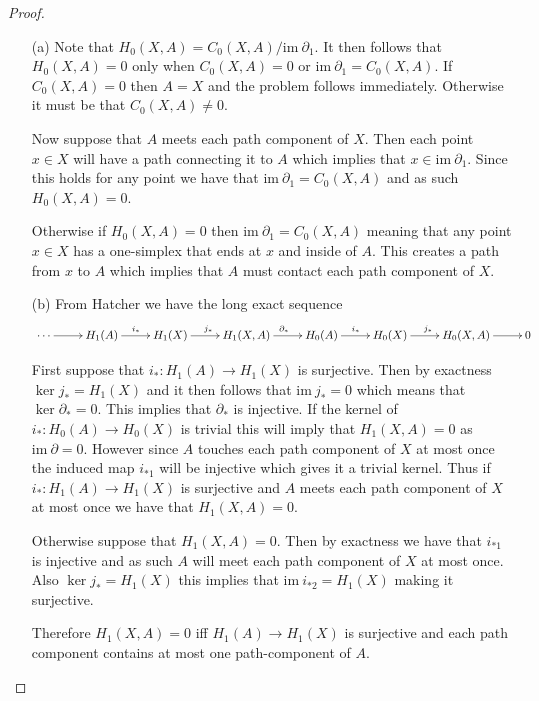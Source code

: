 \documentclass[10pt]{article}
\newcommand{\ima}{\mathrm{im}\ }
\theoremstyle{plain}
\theoremstyle{remark}
\begin{document}
\begin{proof}\ \\
  \begin{enumerate}
  \item[(a)] Note that $H_0(X,A)=C_0(X,A)/\ima\partial_1$. It then follows that
    $H_0(X,A)=0$ only when $C_0(X,A)=0$ or $\ima\partial_1=C_0(X,A)$. If $C_0(X,A)=0$
    then $A=X$ and the problem follows immediately. Otherwise it must
    be that $C_0(X,A)\neq 0$.

    Now suppose that $A$ meets each path component of $X$. Then each
    point $x\in X$ will have a path connecting it to $A$ which implies that
    $x\in\ima \partial_1$. Since this holds for any point we have that $\ima\partial_1=C_0(X,A)$
    and as such $H_0(X,A)=0$.

    Otherwise if $H_0(X,A)=0$ then $\ima\partial_1=C_0(X,A)$ meaning that any
    point $x\in X$ has a one-simplex that ends at $x$ and inside of $A$.
    This creates a path from $x$ to $A$ which implies that $A$ must
    contact each path component of $X$.
  \item[(b)] From Hatcher we have the long exact sequence
    \[
      \xymatrix{\cdots\ar[r]&H_1(A)\ar[r]^{i_*} & H_1(X) \ar[r]^{j_*} & H_1(X,A) \ar[r]^{\partial_*} &
        H_0(A) \ar[r]^{i_*} & H_0(X) \ar[r]^{j_*} & H_0(X,A) \ar[r] & 0}
    \]

    First suppose that $i_*:H_1(A)\rightarrow H_1(X)$ is surjective. Then by exactness
    $\ker j_*=H_1(X)$ and it then follows that $\ima j_*=0$ which means
    that $\ker\partial_*=0$. This implies that $\partial_*$ is injective. If the kernel
    of $i_*:H_0(A)\rightarrow H_0(X)$ is trivial this will imply that $H_1(X,A)=0$ as
    $\ima \partial=0$. However since $A$ touches each path component of $X$ at
    most once the induced map $i_{*1}$ will be injective which gives it a
    trivial kernel. Thus if $i_*:H_1(A)\rightarrow H_1(X)$ is surjective and $A$ meets
    each path component of $X$ at most once we have that $H_1(X,A)=0$.

    Otherwise suppose that $H_1(X,A)=0$. Then by exactness we have
    that $i_{*1}$ is injective and as such $A$ will meet each
    path component of $X$ at most once. Also $\ker j_*=H_1(X)$ this
    implies that $\ima i_{*2}=H_1(X)$ making it surjective.

    Therefore $H_1(X,A)=0$ iff $H_1(A)\rightarrow H_1(X)$ is surjective and each path
    component contains at most one path-component of $A$.
  \end{enumerate}
\end{proof}
\end{document}
